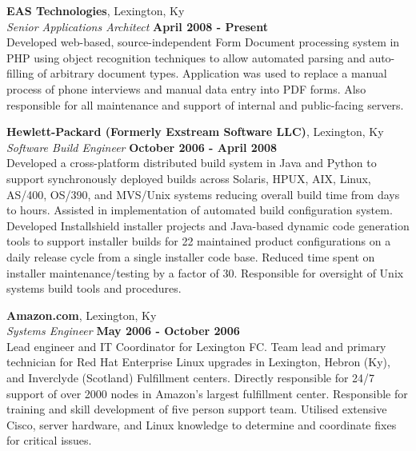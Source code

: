 \documentclass[margin,line]{resume}
\begin{document}
\begin{resume}
    \textbf{EAS Technologies}, Lexington, Ky \\
    \textsl{Senior Applications Architect} \hfill \textbf{April 2008 - Present}\vspace{2mm}\\%
    Developed web-based, source-independent Form Document processing system in PHP 
    using object recognition techniques to allow automated parsing and auto-filling 
    of arbitrary document types.  Application was used to replace a manual process 
    of phone interviews and manual data entry into PDF forms. Also responsible for 
    all maintenance and support of internal and public-facing servers. 

    \textbf{Hewlett-Packard (Formerly Exstream Software LLC)}, Lexington, Ky  \\
    \textsl{Software Build Engineer} \hfill \textbf{October 2006 - April 2008}\vspace{2mm}\\%
    Developed a cross-platform distributed build system in Java and Python to support 
    synchronously deployed builds across Solaris, HPUX, AIX, Linux, AS/400, OS/390, and 
    MVS/Unix systems reducing overall build time from days to hours. Assisted in implementation 
    of automated build configuration system. Developed Installshield installer projects and 
    Java-based dynamic code generation tools to support installer builds for 22 maintained 
    product configurations on a daily release cycle from a single installer code base. Reduced 
    time spent on installer maintenance/testing by a factor of 30. Responsible for oversight
    of Unix systems build tools and procedures.  

    \textbf{Amazon.com}, Lexington, Ky \\
    \textsl{Systems Engineer} \hfill \textbf{May 2006 - October 2006}\vspace{2mm}\\%
    Lead engineer and IT Coordinator for Lexington FC.  Team lead and primary technician for 
    Red Hat Enterprise Linux upgrades in Lexington, Hebron (Ky), and Inverclyde (Scotland) 
    Fulfillment centers.  Directly responsible for 24/7 support of over 2000 nodes in Amazon's 
    largest fulfillment center.  Responsible for training and skill development of five person 
    support team. Utilised extensive Cisco, server hardware, and Linux knowledge to determine 
    and coordinate fixes for critical issues. 


\end{resume}
\end{document}
